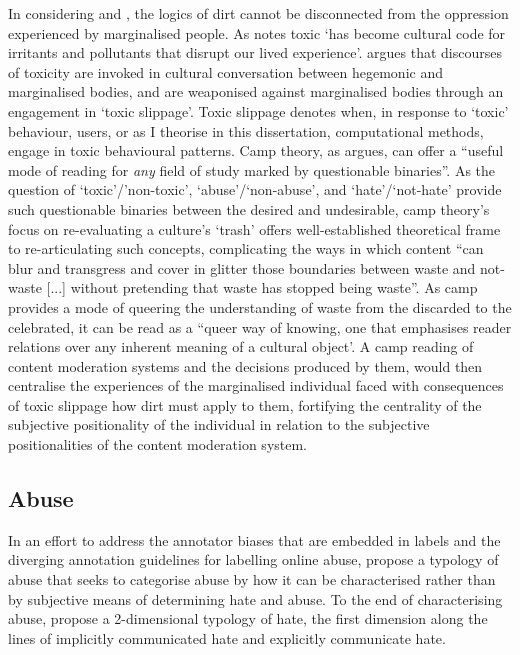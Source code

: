 In considering \cite{Hall:1997} and \cite{Lepawsky:2019}, the logics of dirt cannot be disconnected from the oppression experienced by marginalised people. As \citet{Risam:2015} notes toxic `has become cultural code for irritants and pollutants that disrupt our lived experience'. \citet{Risam:2015} argues that discourses of toxicity are invoked in cultural conversation between hegemonic and marginalised bodies, and are weaponised against marginalised bodies through an engagement in `toxic slippage'. Toxic slippage denotes when, in response to `toxic' behaviour, users, or as I theorise in this dissertation, computational methods, engage in toxic behavioural patterns.
Camp theory, as \citet{Schaffer:2015} argues, can offer a ``useful mode of reading for \textit{any} field of study marked by questionable binaries''. As the question of `toxic'/'non-toxic', `abuse'/`non-abuse', and `hate'/`not-hate' provide such questionable binaries between the desired and undesirable, camp theory's focus on re-evaluating a culture's `trash' offers well-established theoretical frame to re-articulating such concepts, complicating the ways in which content ``can blur and transgress and cover in glitter those boundaries between waste and not-waste [...] without pretending that waste has stopped being waste''\citep{Schaffer:2015}. As camp provides a mode of queering the understanding of waste from the discarded to the celebrated, it can be read as a ``queer way of knowing, one that emphasises reader relations over any inherent meaning of a cultural object'. A camp reading of content moderation systems and the decisions produced by them, would then centralise the experiences of the marginalised individual faced with consequences of toxic slippage how dirt must apply to them, fortifying the centrality of the subjective positionality of the individual in relation to the subjective positionalities of the content moderation system.

\subsection{Abuse}
In an effort to address the annotator biases that are embedded in labels \citep{Waseem:2016} and the diverging annotation guidelines for labelling online abuse, \citet{Waseem:2017} propose a typology of abuse that seeks to categorise abuse by how it can be characterised rather than by subjective means of determining hate and abuse. To the end of characterising abuse, \citet{Waseem:2017} propose a 2-dimensional typology of hate, the first dimension along the lines of implicitly communicated hate and explicitly communicate hate.

